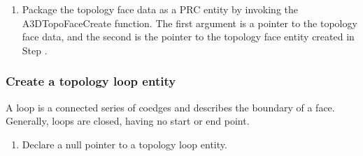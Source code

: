 \documentclass[letterpaper,12pt,english,openany,oneside]{sphinxmanual}
\begin{document}
\begin{sphinxVerbatim}[commandchars=\\\{\}]
    
  
\end{sphinxVerbatim}
\begin{enumerate}
%
\setcounter{enumi}{5}
\item {} 
Package the topology face data as a PRC entity by invoking the A3DTopoFaceCreate function. The first argument is a pointer to the topology face data, and the second is the pointer to the topology face entity created in Step .

\end{enumerate}

\begin{sphinxVerbatim}[commandchars=\\\{\}]
    
\end{sphinxVerbatim}


\subsubsection{Create a topology loop entity}
\label{\detokenize{Plugins_A3D_API:create-a-topology-loop-entity}}
A loop is a connected series of co\sphinxhyphen{}edges and describes the boundary of a face. Generally, loops are closed, having no start or end point.
\begin{enumerate}
%
\item {} 
Declare a null pointer to a topology loop entity.

\end{enumerate}
\end{document}
